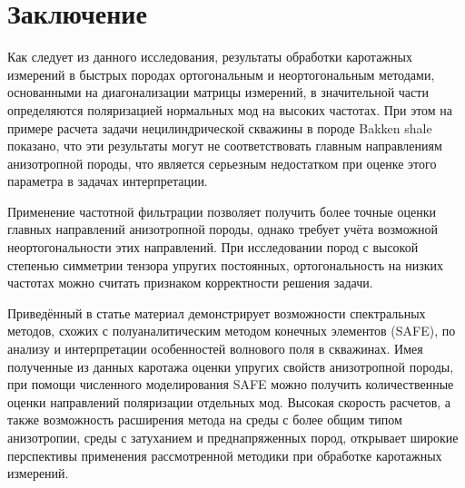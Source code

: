 \documentclass[a4paper,11pt]{article}
\begin{document}
\section{Заключение}

Как следует из данного исследования, результаты обработки каротажных измерений в быстрых породах ортогональным и неортогональным методами, основанными на диагонализации матрицы измерений, в значительной части определяются поляризацией нормальных мод на высоких частотах. При этом на примере расчета задачи нецилиндрической скважины в породе Bakken shale показано, что эти результаты могут не соответствовать главным направлениям анизотропной породы, что является серьезным недостатком при оценке этого параметра в задачах интерпретации. 


Применение частотной фильтрации позволяет получить более точные оценки главных направлений анизотропной породы, однако требует учёта возможной неортогональности этих направлений. При исследовании пород с высокой степенью симметрии тензора упругих постоянных, ортогональность на низких частотах можно считать признаком корректности решения задачи. 


Приведённый в статье материал демонстрирует возможности спектральных методов, схожих с полуаналитическим методом конечных элементов (SAFE), по анализу и интерпретации особенностей волнового поля в скважинах. Имея полученные из данных каротажа оценки упругих свойств анизотропной породы, при помощи численного моделирования SAFE можно получить количественные оценки направлений поляризации отдельных мод. Высокая скорость расчетов, а также возможность расширения метода на среды с более общим типом анизотропии, среды с затуханием и преднапряженных пород, открывает широкие перспективы применения рассмотренной методики при обработке каротажных измерений.

%
%


%
%

%
\end{document}
